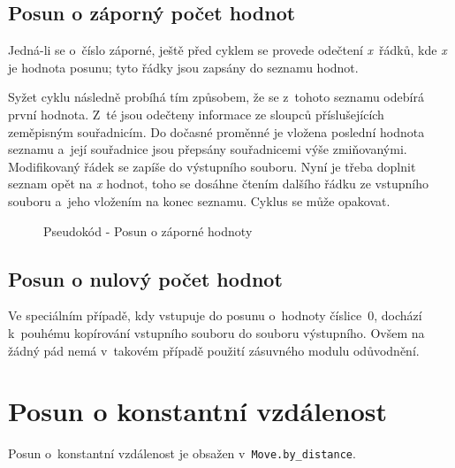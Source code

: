 \subsection{Posun o záporný počet hodnot}
\label{zapornehodnoty}

Jedná-li se o~číslo záporné, ještě před cyklem se provede odečtení \textit{x}~řádků,
kde \textit{x} je hodnota posunu; tyto řádky jsou zapsány do seznamu hodnot.

Syžet cyklu následně probíhá
tím způsobem, že se z~tohoto seznamu odebírá první hodnota. Z~té jsou odečteny informace ze
sloupců příslušejících zeměpisným souřadnicím. Do dočasné proměnné je vložena poslední
hodnota seznamu a~její souřadnice jsou pře\-psány souřadnicemi výše zmiňovanými. Modifikovaný řádek
se zapíše do výstupního souboru. Nyní je třeba doplnit seznam opět na \textit{x} hodnot, toho
se dosáhne čtením dalšího řádku ze vstupního souboru a~jeho vložením na konec seznamu. Cyklus
se může opakovat. 

    \begin{figure}[h]
    \centering
    \begin{algorithmic}[1]
    \ENDWHILE
    \end{algorithmic}
    \caption{Pseudokód - Posun o záporné hodnoty}
    \label{fig:pseudozapornehodnoty}
    \end{figure}

\subsection{Posun o nulový počet hodnot}
\label{nulovehodnoty}

Ve speciálním případě, kdy vstupuje do posunu o~hodnoty číslice~0,
dochází k~pouhé\-mu kopírování vstupního
souboru do souboru výstupního. Ovšem na žádný pád nemá v~takovém případě použití zásuvného modulu
odůvodnění. 

\section{Posun o konstantní vzdálenost}
\label{by_distance}

Posun o~konstantní vzdálenost je obsažen v~{\tt Move.by\_distance}. 

